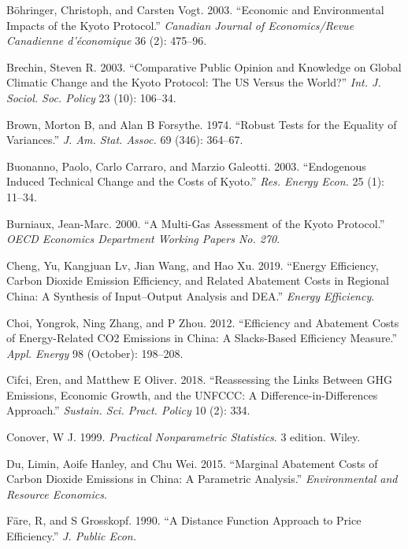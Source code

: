 \documentclass[
  12pt,
]{article}
\begin{document}
\leavevmode\hypertarget{ref-Bohringer2003}{}%
Böhringer, Christoph, and Carsten Vogt. 2003. ``Economic and Environmental Impacts of the Kyoto Protocol.'' \emph{Canadian Journal of Economics/Revue Canadienne d'économique} 36 (2): 475--96.

\leavevmode\hypertarget{ref-Brechin2003}{}%
Brechin, Steven R. 2003. ``Comparative Public Opinion and Knowledge on Global Climatic Change and the Kyoto Protocol: The US Versus the World?'' \emph{Int. J. Sociol. Soc. Policy} 23 (10): 106--34.

\leavevmode\hypertarget{ref-Brown1974}{}%
Brown, Morton B, and Alan B Forsythe. 1974. ``Robust Tests for the Equality of Variances.'' \emph{J. Am. Stat. Assoc.} 69 (346): 364--67.

\leavevmode\hypertarget{ref-Buonanno2003}{}%
Buonanno, Paolo, Carlo Carraro, and Marzio Galeotti. 2003. ``Endogenous Induced Technical Change and the Costs of Kyoto.'' \emph{Res. Energy Econ.} 25 (1): 11--34.

\leavevmode\hypertarget{ref-Burniaux2000}{}%
Burniaux, Jean-Marc. 2000. ``A Multi-Gas Assessment of the Kyoto Protocol.'' \emph{OECD Economics Department Working Papers No. 270}.

\leavevmode\hypertarget{ref-Cheng2019}{}%
Cheng, Yu, Kangjuan Lv, Jian Wang, and Hao Xu. 2019. ``Energy Efficiency, Carbon Dioxide Emission Efficiency, and Related Abatement Costs in Regional China: A Synthesis of Input--Output Analysis and DEA.'' \emph{Energy Efficiency}.

\leavevmode\hypertarget{ref-Choi2012}{}%
Choi, Yongrok, Ning Zhang, and P Zhou. 2012. ``Efficiency and Abatement Costs of Energy-Related CO2 Emissions in China: A Slacks-Based Efficiency Measure.'' \emph{Appl. Energy} 98 (October): 198--208.

\leavevmode\hypertarget{ref-Cifci2018}{}%
Cifci, Eren, and Matthew E Oliver. 2018. ``Reassessing the Links Between GHG Emissions, Economic Growth, and the UNFCCC: A Difference-in-Differences Approach.'' \emph{Sustain. Sci. Pract. Policy} 10 (2): 334.

\leavevmode\hypertarget{ref-Conover1999}{}%
Conover, W J. 1999. \emph{Practical Nonparametric Statistics}. 3 edition. Wiley.

\leavevmode\hypertarget{ref-Du2015}{}%
Du, Limin, Aoife Hanley, and Chu Wei. 2015. ``Marginal Abatement Costs of Carbon Dioxide Emissions in China: A Parametric Analysis.'' \emph{Environmental and Resource Economics}.

\leavevmode\hypertarget{ref-Fare1990}{}%
Färe, R, and S Grosskopf. 1990. ``A Distance Function Approach to Price Efficiency.'' \emph{J. Public Econ.}
\end{document}
